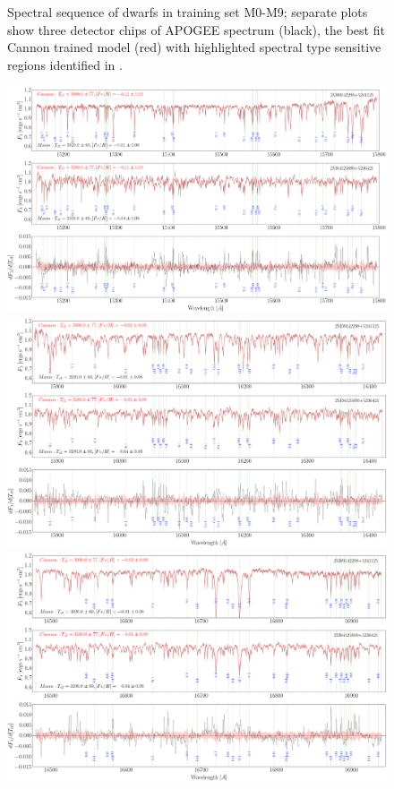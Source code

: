\documentclass[modern]{aastex62}
\begin{document}
\begin{figure}[ht]
\caption{Spectral sequence of dwarfs in training set M0-M9; separate plots show three detector chips of APOGEE spectrum (black), the best fit Cannon trained model (red) with highlighted spectral type sensitive regions identified in \citealt{Desphande:2013}.} \label{fig:sp_sequence}
\end{figure}

\begin{figure}[ht]
\begin{center}
\includegraphics[width=16cm]{figures/demo_derivatives_teff1.png}
\includegraphics[width=16cm]{figures/demo_derivatives_teff2.png}
\includegraphics[width=16cm]{figures/demo_derivatives_teff3.png}

\end{center}
\end{figure}
\end{document}
